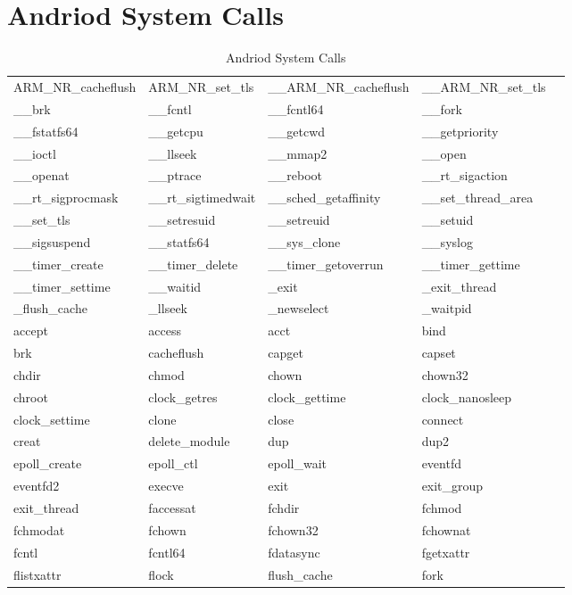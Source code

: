 \chapter{Andriod System Calls}
\thispagestyle{plain}
\begin{center}
\label{Andriod System Calls}
\begin{table}
\caption{Andriod System Calls}
\bigskip
\begin{tabular}{l p{3.5cm} p{3.5cm} p{3.5cm} p{3.5cm}|}
\hline
ARM\_NR\_cacheflush & ARM\_NR\_set\_tls & \_\_ARM\_NR\_cacheflush & \_\_ARM\_NR\_set\_tls \\
\_\_brk & \_\_fcntl & \_\_fcntl64 & \_\_fork \\
\_\_fstatfs64 & \_\_getcpu & \_\_getcwd & \_\_getpriority \\
\_\_ioctl & \_\_llseek & \_\_mmap2 & \_\_open \\
\_\_openat & \_\_ptrace & \_\_reboot & \_\_rt\_sigaction \\
\_\_rt\_sigprocmask & \_\_rt\_sigtimedwait & \_\_sched\_getaffinity & \_\_set\_thread\_area \\
\_\_set\_tls & \_\_setresuid & \_\_setreuid & \_\_setuid \\
\_\_sigsuspend & \_\_statfs64 & \_\_sys\_clone & \_\_syslog \\
\_\_timer\_create & \_\_timer\_delete & \_\_timer\_getoverrun & \_\_timer\_gettime \\
\_\_timer\_settime & \_\_waitid & \_exit & \_exit\_thread \\
\_flush\_cache & \_llseek & \_newselect & \_waitpid \\
accept & access & acct & bind \\
brk & cacheflush & capget & capset \\
chdir & chmod & chown & chown32 \\
chroot & clock\_getres & clock\_gettime & clock\_nanosleep \\
clock\_settime & clone & close & connect \\
creat & delete\_module & dup & dup2 \\
epoll\_create & epoll\_ctl & epoll\_wait & eventfd \\
eventfd2 & execve & exit & exit\_group \\
exit\_thread & faccessat & fchdir & fchmod \\
fchmodat & fchown & fchown32 & fchownat \\
fcntl & fcntl64 & fdatasync & fgetxattr \\
flistxattr & flock & flush\_cache & fork \\

\end{tabular}
\end{table}
\end{center}
